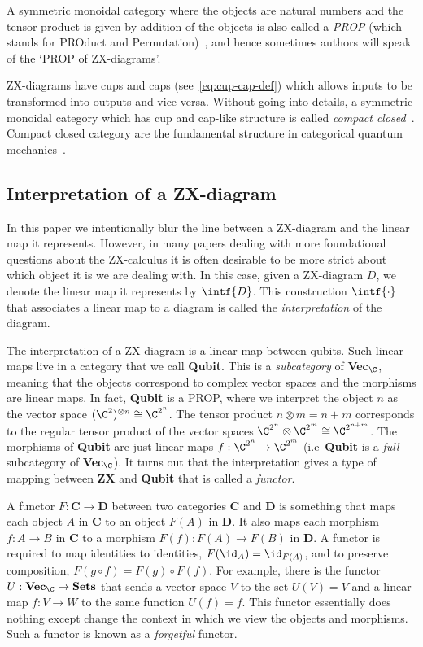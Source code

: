 \documentclass[a4paper,onecolumn,superscriptaddress,11pt,%
				unpublished,%
				allowfontchageintitle,%
				]{quantumarticle}
\begin{document}
A symmetric monoidal category where the objects are natural numbers and the tensor product is given by addition of the objects is also called a \emph{PROP} (which stands for PROduct and Permutation)~\cite{maclane1965categorical}, and hence sometimes authors will speak of the `PROP of ZX-diagrams'.

ZX-diagrams have cups and caps (see~\eqref{eq:cup-cap-def}) which allows inputs to be transformed into outputs and vice versa. Without going into details, a symmetric monoidal category which has cup and cap-like structure is called \emph{compact closed}~\cite{kelly1980coherence}.
Compact closed category are the fundamental structure in categorical quantum mechanics~\cite{abramsky2004categorical}.

\subsection{Interpretation of a ZX-diagram}

In this paper we intentionally blur the line between a ZX-diagram and the linear map it represents. However, in many papers dealing with more foundational questions about the ZX-calculus it is often desirable to be more strict about which object it is we are dealing with.
In this case, given a ZX-diagram $D$, we denote the linear map it represents by $\intf{D}$. This construction $\intf{\cdot}$ that associates a linear map to a diagram is called the \emph{interpretation} of the diagram.

The interpretation of a ZX-diagram is a linear map between qubits. Such linear maps live in a category that we call \textbf{Qubit}. This is a \emph{subcategory} of \textbf{Vec}$_\C$, meaning that the objects correspond to complex vector spaces and the morphisms are linear maps. In fact, \textbf{Qubit} is a PROP, where we interpret the object $n$ as the vector space $(\C^2)^{\otimes n} \cong \C^{2^n}$. The tensor product $n\otimes m = n+m$ corresponds to the regular tensor product of the vector spaces $\C^{2^n}\otimes \C^{2^m} \cong \C^{2^{n+m}}$.
The morphisms of \textbf{Qubit} are just linear maps $f:\C^{2^n}\rightarrow \C^{2^m}$ (i.e~\textbf{Qubit} is a \emph{full} subcategory of \textbf{Vec}$_\C$).
It turns out that the interpretation gives a type of mapping between \textbf{ZX} and \textbf{Qubit} that is called a \emph{functor}.

A functor $F:\textbf{C}\rightarrow \textbf{D}$ between two categories \textbf{C} and \textbf{D} is something that maps each object $A$ in \textbf{C} to an object $F(A)$ in \textbf{D}. It also maps each morphism $f:A\rightarrow B$ in \textbf{C} to a morphism $F(f):F(A)\rightarrow F(B)$ in \textbf{D}. A functor is required to map identities to identities, $F(\id_A)=\id_{F(A)}$, and to preserve composition, $F(g\circ f) = F(g)\circ F(f)$.
For example, there is the functor $U:\textbf{Vec}_\C\rightarrow \textbf{Sets}$ that sends a vector space $V$ to the set $U(V)=V$ and a linear map $f:V\rightarrow W$ to the same function $U(f) = f$. This functor essentially does nothing except change the context in which we view the objects and morphisms. Such a functor is known as a \emph{forgetful} functor.
\end{document}
